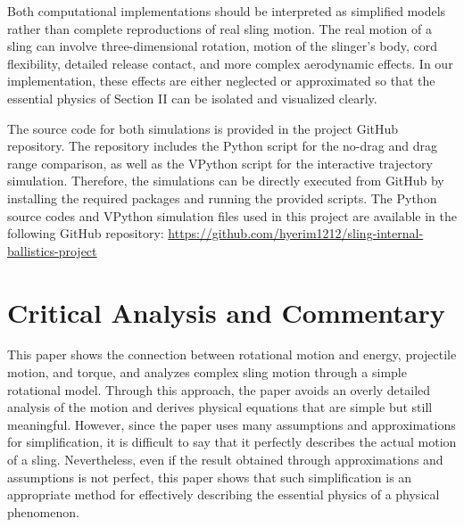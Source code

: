 \documentclass[11pt,letterpaper]{article}
\begin{document}
Both computational implementations should be interpreted as simplified
models rather than complete reproductions of real sling motion. The real
motion of a sling can involve three-dimensional rotation, motion of the
slinger's body, cord flexibility, detailed release contact, and more
complex aerodynamic effects. In our implementation, these effects are
either neglected or approximated so that the essential physics of
Section II can be isolated and visualized clearly.

The source code for both simulations is provided in the project GitHub
repository. The repository includes the Python script for the no-drag
and drag range comparison, as well as the VPython script for the
interactive trajectory simulation. Therefore, the simulations can be
directly executed from GitHub by installing the required packages and
running the provided scripts. The Python source codes and VPython simulation files used in this project are available in the following GitHub repository: \url{https://github.com/hyerim1212/sling-internal-ballistics-project}
\section{Critical Analysis and Commentary}
This paper shows the connection between rotational motion and energy, projectile motion, and torque, and analyzes complex sling motion through a simple rotational model. Through this approach, the paper avoids an overly detailed analysis of the motion and derives physical equations that are simple but still meaningful. However, since the paper uses many assumptions and approximations for simplification, it is difficult to say that it perfectly describes the actual motion of a sling. Nevertheless, even if the result obtained through approximations and assumptions is not perfect, this paper shows that such simplification is an appropriate method for effectively describing the essential physics of a physical phenomenon.

\end{document}
